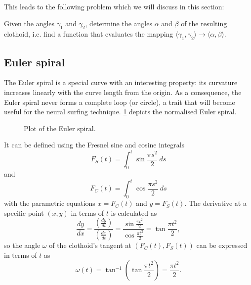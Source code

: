 This leads to the following problem which we will discuss in this section:

\begin{problem}
    \label{prob:clothoid_construction}
    Given the angles $\gamma_1$ and $\gamma_2$, determine the angles $\alpha$ and $\beta$ of the resulting clothoid, i.e. find a function that evaluates the mapping $\langle\gamma_1,\gamma_2\rangle\rightarrow\langle\alpha,\beta\rangle$.
\end{problem}

\subsection{Euler spiral}
The Euler spiral is a special curve with an interesting property: its curvature increases linearly with the curve length from the origin.
As a consequence, the Euler spiral never forms a complete loop (or circle), a trait that will become useful for the neural surfing technique. 
\ref{fig:euler_spiral} depicts the normalised Euler spiral.
\begin{figure}
    \centering
    \caption{Plot of the Euler spiral.}
    \label{fig:euler_spiral}
\end{figure}
It can be defined using the Fresnel sine and cosine integrals
\begin{equation}
    \label{eq:fresnel_sine}
    F_S(t) = \int_0^t{\sin\frac{\pi s^2}{2} \ ds}
\end{equation}
and
\begin{equation}
    \label{eq:fresnel_cosine}
    F_C(t) = \int_0^t{\cos\frac{\pi s^2}{2} \ ds}
\end{equation}
with the parametric equations $x=F_C(t)$ and $y=F_S(t)$.
The derivative at a specific point $(x, y)$ in terms of $t$ is calculated as
\begin{equation*}
    \frac{dy}{dx}
    = \frac{\displaystyle\left(\frac{dy}{dt}\right)}{\displaystyle\left(\frac{dx}{dt}\right)}
    = \frac{\displaystyle\sin\frac{\pi t^2}{2}}{\displaystyle\cos\frac{\pi t^2}{2}}
    = \tan \frac{\pi t^2}{2},
\end{equation*}
so the angle $\omega$ of the clothoid's tangent at $\left(F_C(t),F_S(t)\right)$ can be expressed in terms of $t$ as
\begin{equation}
    \label{eq:clothoid_tangent_angle}
    \omega(t) = \tan^{-1} \left( \tan \frac{\pi t^2}{2} \right)
    = \frac{\pi t^2}{2}.
\end{equation}

